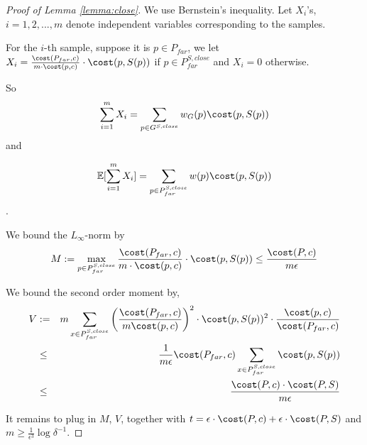 \begin{proof} [Proof of Lemma \ref{lemma:close}]

We use Bernstein's inequality. Let $X_i$'s, $i=1,2,...,m$ denote independent variables corresponding to the samples. 

For the $i$-th sample, suppose it is $p\in P_{far}$, we let $X_i=\frac{\cost(P_{far},c)}{m\cdot \cost(p,c)}\cdot \cost(p,S(p))$ if $p\in P_{far}^{S,close}$ and $X_i=0$ otherwise.

So $$\sum_{i=1}^m X_i=\sum_{p\in G^{S,close}}w_G(p)\cost(p,S(p)) $$
and 

$$\mathbb{E}[\sum_{i=1}^m X_i]=\sum_{p\in P_{far}^{S,close}}w(p)\cost(p,S(p))$$.

We bound the $L_{\infty}$-norm by
$$
M:=\max_{p\in P_{far}^{S,close}} \frac{\cost(P_{far},c)}{m\cdot \cost(p,c)}\cdot \cost(p,S(p))\leq \frac{\cost(P,c)}{m\epsilon}
$$

We bound the second order moment by,
\begin{eqnarray*}
V&:=&m\sum_{x\in P_{far}^{S,close}} 
\bigg{(}\frac{\cost(P_{far},c)}{m\cost(p,c)}
\bigg{)}^2\cdot \cost(p,S(p))^2 \cdot \frac{\cost(p,c)}{\cost(P_{far},c)}\\
&\leq &\frac{1}{m\epsilon}\cost(P_{far},c)\sum_{x\in P_{far}^{S,close}} \cost(p,S(p))\\
&\leq &\frac{\cost(P,c)\cdot \cost(P,S)}{m\epsilon}
\end{eqnarray*}

It remains to plug in $M$, $V$, together with $t=\epsilon\cdot \cost(P,c)+\epsilon\cdot \cost(P,S)$ and $m\geq \frac{1}{\epsilon^3}\log\delta^{-1}$.


\end{proof}



